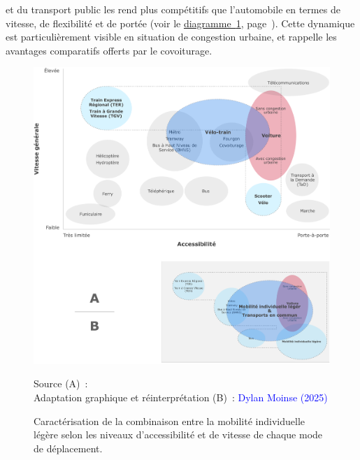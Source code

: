 \begin{refsegment}
et du transport public les rend plus compétitifs que l'automobile en termes de vitesse, de flexibilité et de portée (voir le \hyperref[fig-chap1:vitesse-accessibilite-velo-tc]{diagramme~\ref{fig-chap1:vitesse-accessibilite-velo-tc}}, page~\pageref{fig-chap1:vitesse-accessibilite-velo-tc}). Cette dynamique est particulièrement visible en situation de congestion urbaine, et rappelle les avantages comparatifs offerts par le covoiturage.%

    \begin{figure}[h!]\vspace*{4pt}
        \caption{Caractérisation de la combinaison entre la mobilité individuelle légère selon les niveaux d'accessibilité et de vitesse de chaque mode de déplacement.}
        \label{fig-chap1:vitesse-accessibilite-velo-tc}
        \centerline{\includegraphics[width=1\columnwidth]{src/Figures/Chap-1/FR_Kager_vitesse_accessibilite.pdf}}
        \vspace{5pt}
        \begin{flushright}\scriptsize{
        Source (A)~: \textcolor{blue}{\textcite[212]{kager_characterisation_2016}}
        \\
        Adaptation graphique et réinterprétation (B)~: \textcolor{blue}{Dylan Moinse (2025)}
        }\end{flushright}
    \end{figure}


\end{refsegment}
